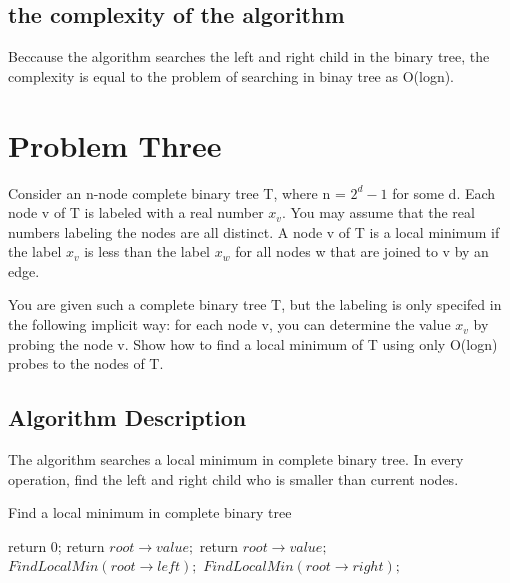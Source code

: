 \documentclass{article}
\begin{document}
\subsection{the complexity of the algorithm}

Beccause the algorithm searches the left and right child in the binary tree, the complexity is equal to the problem of searching in binay tree as O(logn).

\newpage
\section{Problem Three}

Consider an n-node complete binary tree T, where n = $2^d - 1$ for some d. Each node v of T is labeled with a real number $x_v$. You may assume that the real numbers labeling the nodes are all distinct. A node v of T is a local minimum if the label $x_v$ is less than the label $x_w$ for all nodes w that are joined to v by an edge.

You are given such a complete binary tree T, but the labeling is only specifed in the following implicit way: for each node v, you can determine the value $x_v$ by probing the node v. Show how to find a local minimum of T using only O(logn) probes to the nodes of T.


\subsection{Algorithm Description}

The algorithm searches a local minimum in complete binary tree. In every operation, find the left and right child who is smaller than current nodes.

\begin{algorithm}[htbp]  
  \caption{Find a local minimum in complete binary tree}  
  \begin{algorithmic}[1] 
	 \State return 0; 
      \EndIf
	 \State return $root\rightarrow value;$
      \EndIf 
	 \State return $root\rightarrow value;$
      \EndIf 
	 \State $FindLocalMin(root\rightarrow left);$
	\EndIf
	 \State $FindLocalMin(root\rightarrow right);$
	\EndIf
    \EndFunction  
  \end{algorithmic}  
\end{algorithm} 
\end{document}
